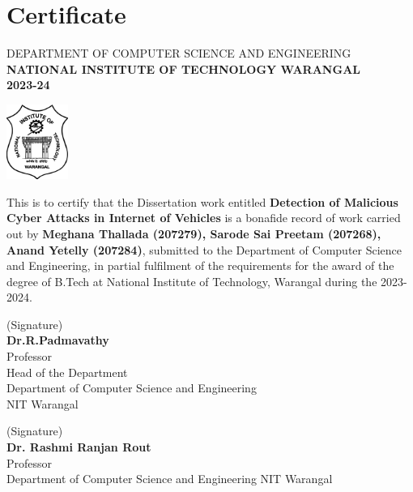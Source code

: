 \chapter*{\centering Certificate}
\begin{center}
\vspace{-10cm}
\large{DEPARTMENT OF COMPUTER SCIENCE AND ENGINEERING} \\
\vspace{0.3cm}
\textbf{\Large{NATIONAL INSTITUTE OF TECHNOLOGY WARANGAL}} \\
\textbf{\Large{2023-24}}
\end{center}


\begin{center}
    
 \vspace{0.5cm}
       \includegraphics[width=20mm]{uglo}
      \\
      \vspace{1.5cm}   
\end{center}
\vspace{2cm}
This is to certify that the Dissertation work entitled \textbf {Detection of Malicious Cyber Attacks in Internet of Vehicles} is a bonafide
record of work carried out by 
\textbf{Meghana Thallada (207279),
        Sarode Sai Preetam (207268),
        Anand Yetelly (207284)}, submitted to the 
Department of Computer Science and Engineering, in partial fulfilment of the requirements for the award of the degree
of B.Tech at National Institute of Technology,
Warangal during the 2023-2024.\\
\begin{minipage}{2in}
\vspace{8em}
(Signature) \\
\textbf{Dr.R.Padmavathy}\\
Professor\\
Head of the Department \\
Department of Computer Science and Engineering \\
NIT Warangal
\end{minipage}
\hfill
\begin{minipage}{2in}
\vspace{8em}
(Signature) \\
\textbf{Dr. Rashmi Ranjan Rout }\\
Professor\\
Department of Computer Science and Engineering
NIT Warangal
\end{minipage}

